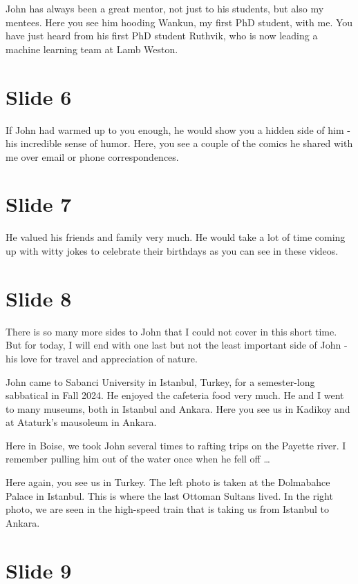 \documentclass[journal,twoside,web]{ieeecolor}
\begin{document}
John has always been a great mentor, not just to his students, but also my 
mentees. Here you see him hooding Wankun, my first PhD student, with me. You 
have just heard from his first PhD student Ruthvik, who is now leading a 
machine learning team at Lamb Weston.


\section{Slide 6}

If John had warmed up to you enough, he would show you a hidden side of
him - his incredible sense of humor. Here, you see a couple of the comics he
shared with me over email or phone correspondences.

\section{Slide 7}

He valued his friends and family very much. He would take a lot of time coming 
up with witty jokes to celebrate their birthdays as you can see in these videos.

\section{Slide 8}

There is so many more sides to John that I could not cover in this short time.
But for today, I will end with one last but not the least important side of John
- his love for travel and appreciation of nature.

John came to Sabanci University in Istanbul, Turkey, for a semester-long 
sabbatical in Fall 2024. He enjoyed the cafeteria food very much. He and I went 
to many museums, both in Istanbul and Ankara. Here you see us in Kadikoy and 
at Ataturk's mausoleum in Ankara. 

Here in Boise, we took John several times to rafting trips on the Payette river.
I remember pulling him out of the water once when he fell off \ldots

Here again,  you see us in Turkey. The left photo is taken at the Dolmabahce Palace in Istanbul. This is where the last Ottoman Sultans lived. In the 
right photo, we are seen in the high-speed train that is taking us from Istanbul to Ankara.


\section{Slide 9}
\end{document}
